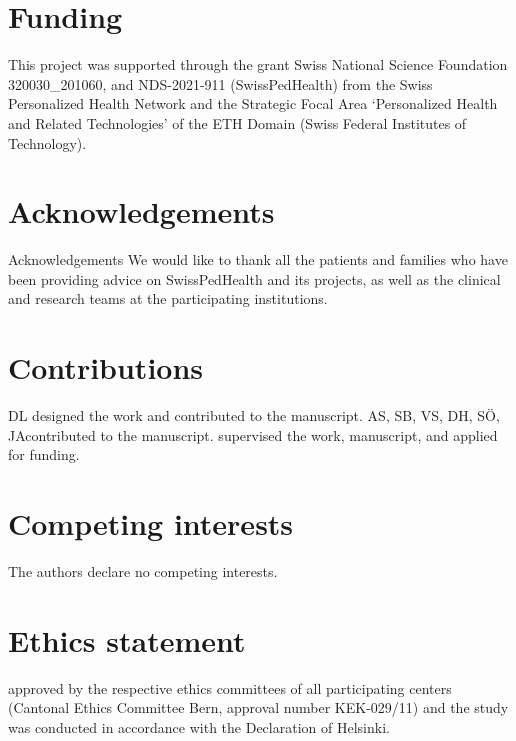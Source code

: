 \DIFaddbegin \FloatBarrier

\DIFaddend \section{Funding}
This project was supported through the grant Swiss National Science Foundation  320030\_201060, and NDS-2021-911 (SwissPedHealth) from the Swiss Personalized Health Network and the Strategic Focal Area `Personalized Health and Related Technologies' of the ETH Domain (Swiss Federal Institutes of Technology).

\section{Acknowledgements}
Acknowledgements We would like to thank all the patients and families who have been providing advice on SwissPedHealth and its projects, as well as the clinical and research teams at the participating institutions.

\section{Contributions}
DL designed the work and contributed to the manuscript.
AS, SB, VS, DH, SÖ, JA\DIFaddbegin {}\DIFaddend contributed to the manuscript.
\DIFdelbegin {}\DIFdelend \DIFaddbegin {}\DIFaddend supervised the work, manuscript, and applied for funding.

\section{Competing interests}
The authors declare no competing interests.

\section{Ethics statement}
\DIFdelbegin {}\DIFdelend \DIFaddbegin {}\DIFaddend approved by the respective ethics committees of all participating centers (Cantonal Ethics Committee Bern, approval number KEK-029/11) and the study was conducted in accordance with the Declaration of Helsinki.


 
\DIFaddbegin \clearpage
\FloatBarrier

\beginsupplement
